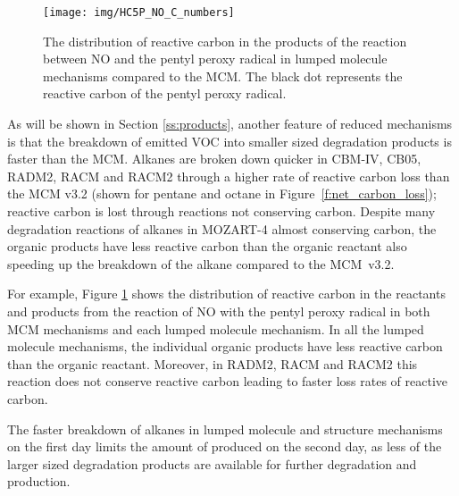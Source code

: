 %
\begin{figure}
    \centering
    \caption{The distribution of reactive carbon in the products of the reaction between NO and the pentyl peroxy radical in lumped molecule mechanisms compared to the MCM. The black dot represents the reactive carbon of the pentyl peroxy radical.}
    \texttt{[image: img/HC5P\_NO\_C\_numbers]}
    \label{f:HC5P_NO}
    \vspace{-2mm}
\end{figure}
%
As will be shown in Section \ref{ss:products}, another feature of reduced mechanisms is that the breakdown of emitted VOC into smaller sized degradation products is faster than the MCM.
Alkanes are broken down quicker in CBM-IV, CB05, RADM2, RACM and RACM2 through a higher rate of reactive carbon loss than the MCM v3.2 (shown for pentane and octane in \mbox{Figure \ref{f:net_carbon_loss}}); reactive carbon is lost through reactions not conserving carbon.
Despite many degradation reactions of alkanes in MOZART-4 almost conserving carbon, the organic products have less reactive carbon than the organic reactant also speeding up the breakdown of the alkane compared to the \mbox{MCM v3.2}.

For example, Figure \ref{f:HC5P_NO} shows the distribution of reactive carbon in the reactants and products from the reaction of NO with the pentyl peroxy radical in both MCM mechanisms and each lumped molecule mechanism.
In all the lumped molecule mechanisms, the individual organic products have less reactive carbon than the organic reactant. 
Moreover, in RADM2, RACM and RACM2 this reaction does not conserve reactive carbon leading to faster loss rates of reactive carbon. 

The faster breakdown of alkanes in lumped molecule and structure mechanisms on the first day limits the amount of  produced on the second day, as less of the larger sized degradation products are available for further degradation and  production.  
%
